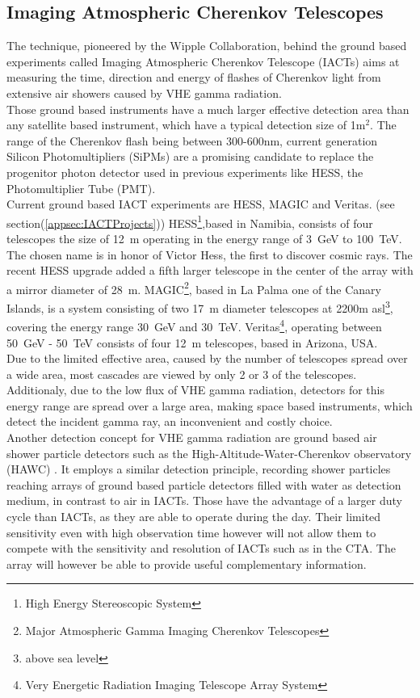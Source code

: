 \documentclass[12pt,article,type=msc,colorback,accentcolor=tud9c]{tudthesis}
\begin{document}
\subsection{Imaging Atmospheric Cherenkov Telescopes}
The technique, pioneered by the Wipple Collaboration, behind the ground based experiments called Imaging Atmospheric Cherenkov Telescope (IACTs) aims at measuring the time, direction and energy of flashes of Cherenkov light from extensive air showers caused by VHE gamma radiation.\\
Those ground based instruments have a much larger effective detection area than any satellite based instrument, which have a typical detection size of 1m$^2$. The range of the Cherenkov flash being between 300-600nm, current generation Silicon Photomultipliers (SiPMs) are a promising candidate to replace the progenitor photon detector used in previous experiments like HESS, the Photomultiplier Tube (PMT).\\

Current ground based IACT experiments are HESS, MAGIC and Veritas. (see section(\ref{appsec:IACTProjects})) HESS\footnote{High Energy Stereoscopic System},based in Namibia, consists of four telescopes the size of 12~m operating in the energy range of 3~GeV to 100~TeV. The chosen name is in honor of Victor Hess, the first to discover cosmic rays. The recent HESS upgrade added a fifth larger telescope in the center of the array with a mirror diameter of 28~m. MAGIC\footnote{Major Atmospheric Gamma Imaging Cherenkov Telescopes}, based in La Palma one of the Canary Islands, is a system consisting of two 17~m diameter telescopes at 2200m asl\footnote{above sea level}, covering the energy range 30~GeV and 30~TeV. Veritas\footnote{Very Energetic Radiation Imaging Telescope Array System}, operating between 50~GeV - 50~TeV consists of four 12~m telescopes, based in Arizona, USA. \\

Due to the limited effective area, caused by the number of telescopes spread over a wide area, most cascades are viewed by only 2 or 3 of the telescopes. Additionaly, due to the low flux of VHE gamma radiation, detectors for this energy range are spread over a large area, making space based instruments, which detect the incident gamma ray, an inconvenient and costly choice.\\ 

Another detection concept for VHE gamma radiation are ground based air shower particle detectors such as the High-Altitude-Water-Cherenkov observatory (HAWC) \cite{HAWC}. It employs a similar detection principle, recording shower particles reaching arrays of ground based particle detectors filled with water as detection medium, in contrast to air in IACTs. Those have the advantage of a larger duty cycle than IACTs, as they are able to operate during the day. Their limited sensitivity even with high observation time however will not allow them to compete with the sensitivity and resolution of IACTs such as in the CTA. The array will however be able to provide useful complementary information. 
\end{document}
